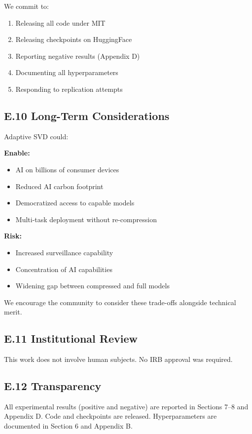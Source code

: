 We commit to:
\begin{enumerate}
\item Releasing all code under MIT
\item Releasing checkpoints on HuggingFace
\item Reporting negative results (Appendix D)
\item Documenting all hyperparameters
\item Responding to replication attempts

\end{enumerate}
\subsection{E.10 Long-Term Considerations}

Adaptive SVD could:

\textbf{Enable:}
\begin{itemize}
\item AI on billions of consumer devices
\item Reduced AI carbon footprint
\item Democratized access to capable models
\item Multi-task deployment without re-compression

\end{itemize}
\textbf{Risk:}
\begin{itemize}
\item Increased surveillance capability
\item Concentration of AI capabilities
\item Widening gap between compressed and full models

\end{itemize}
We encourage the community to consider these trade-offs alongside technical 
merit.

\subsection{E.11 Institutional Review}

This work does not involve human subjects. No IRB approval was required.

\subsection{E.12 Transparency}

All experimental results (positive and negative) are reported in Sections 
7--8 and Appendix D. Code and checkpoints are released. Hyperparameters are 
documented in Section 6 and Appendix B.